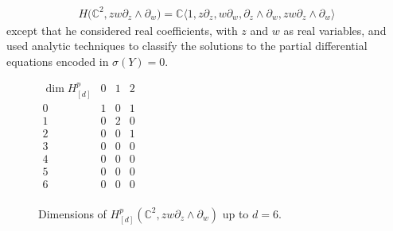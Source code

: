\documentclass[10pt,a4paper]{amsart}
\numberwithin{equation}{section}
\begin{document}
\begin{gather*}
H\big({\mathbb C}^2,zw\partial_z\wedge\partial_w\big)={\mathbb C}\langle 1,z\partial_z,w\partial_w,\partial_z\wedge\partial_w,zw\partial_z\wedge\partial_w\rangle
\end{gather*}
except that he considered real coef\/f\/icients, with $z$ and $w$ as real variables, and used analytic techniques to classify the solutions to the partial dif\/ferential equations encoded in $\sigma(Y)=0$.

\begin{figure}[t]\centering
$
\begin{array}{c|ccc}
\dim H_{[d]}^p & 0 & 1 & 2 \\ \hline
0 & 1 & 0 & 1 \\
1 & 0 & 2 & 0 \\
2 & 0 & 0 & 1 \\
3 & 0 & 0 & 0 \\
4 & 0 & 0 & 0 \\
5 & 0 & 0 & 0 \\
6 & 0 & 0 & 0 \\
\end{array}
$
\caption{\label{Nakanishi_vanishing_table}Dimensions of $H^p_{[d]}({\mathbb C}^2,zw\partial_z\wedge\partial_w)$ up to $d=6$.}
\end{figure}
\end{document}
